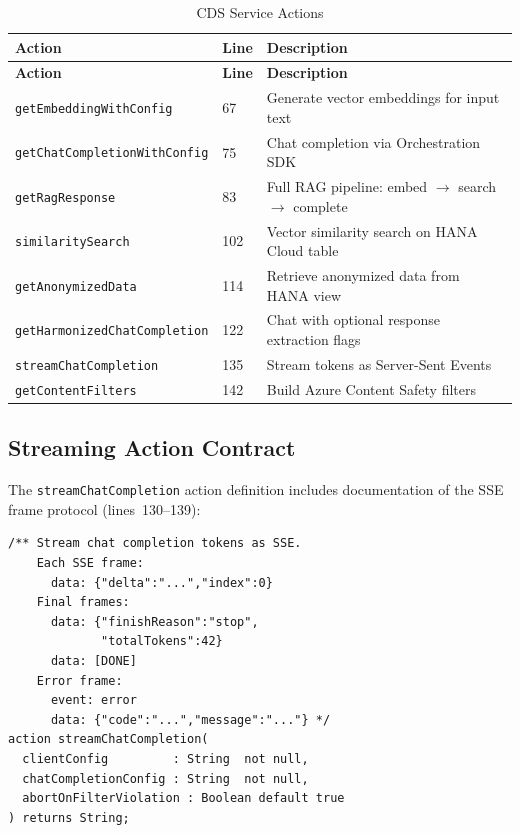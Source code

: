 \documentclass[11pt]{article}
\begin{document}
\begin{longtable}{@{}llp{7cm}@{}}
\caption{CDS Service Actions} \\
\toprule
\textbf{Action} & \textbf{Line} & \textbf{Description} \\
\midrule
\endfirsthead
\toprule
\textbf{Action} & \textbf{Line} & \textbf{Description} \\
\midrule
\endhead
\texttt{getEmbeddingWithConfig} & 67 & Generate vector embeddings for input text \\
\texttt{getChatCompletionWithConfig} & 75 & Chat completion via Orchestration SDK \\
\texttt{getRagResponse} & 83 & Full RAG pipeline: embed $\rightarrow$ search $\rightarrow$ complete \\
\texttt{similaritySearch} & 102 & Vector similarity search on HANA Cloud table \\
\texttt{getAnonymizedData} & 114 & Retrieve anonymized data from HANA view \\
\texttt{getHarmonizedChatCompletion} & 122 & Chat with optional response extraction flags \\
\texttt{streamChatCompletion} & 135 & Stream tokens as Server-Sent Events \\
\texttt{getContentFilters} & 142 & Build Azure Content Safety filters \\
\bottomrule
\end{longtable}

\subsection{Streaming Action Contract}

The \texttt{streamChatCompletion} action definition includes documentation of
the SSE frame protocol (lines~130--139):

\begin{lstlisting}[language=CDS,caption={streamChatCompletion contract (llm-service.cds, lines 130--139)},firstnumber=130]
/** Stream chat completion tokens as SSE.
    Each SSE frame:
      data: {"delta":"...","index":0}
    Final frames:
      data: {"finishReason":"stop",
             "totalTokens":42}
      data: [DONE]
    Error frame:
      event: error
      data: {"code":"...","message":"..."} */
action streamChatCompletion(
  clientConfig         : String  not null,
  chatCompletionConfig : String  not null,
  abortOnFilterViolation : Boolean default true
) returns String;
\end{lstlisting}
\end{document}
